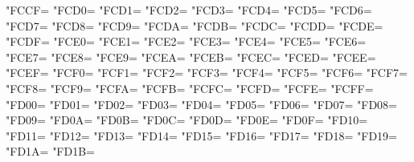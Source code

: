 \XeTeXcharclass"FCCF=\KclassArabU
\XeTeXcharclass"FCD0=\KclassArabU
\XeTeXcharclass"FCD1=\KclassArabU
\XeTeXcharclass"FCD2=\KclassArabU
\XeTeXcharclass"FCD3=\KclassArabU
\XeTeXcharclass"FCD4=\KclassArabU
\XeTeXcharclass"FCD5=\KclassArabU
\XeTeXcharclass"FCD6=\KclassArabU
\XeTeXcharclass"FCD7=\KclassArabU
\XeTeXcharclass"FCD8=\KclassArabU
\XeTeXcharclass"FCD9=\KclassArabU
\XeTeXcharclass"FCDA=\KclassArabU
\XeTeXcharclass"FCDB=\KclassArabU
\XeTeXcharclass"FCDC=\KclassArabU
\XeTeXcharclass"FCDD=\KclassArabU
\XeTeXcharclass"FCDE=\KclassArabU
\XeTeXcharclass"FCDF=\KclassArabU
\XeTeXcharclass"FCE0=\KclassArabU
\XeTeXcharclass"FCE1=\KclassArabU
\XeTeXcharclass"FCE2=\KclassArabU
\XeTeXcharclass"FCE3=\KclassArabU
\XeTeXcharclass"FCE4=\KclassArabU
\XeTeXcharclass"FCE5=\KclassArabU
\XeTeXcharclass"FCE6=\KclassArabU
\XeTeXcharclass"FCE7=\KclassArabU
\XeTeXcharclass"FCE8=\KclassArabU
\XeTeXcharclass"FCE9=\KclassArabU
\XeTeXcharclass"FCEA=\KclassArabU
\XeTeXcharclass"FCEB=\KclassArabU
\XeTeXcharclass"FCEC=\KclassArabU
\XeTeXcharclass"FCED=\KclassArabU
\XeTeXcharclass"FCEE=\KclassArabU
\XeTeXcharclass"FCEF=\KclassArabU
\XeTeXcharclass"FCF0=\KclassArabU
\XeTeXcharclass"FCF1=\KclassArabU
\XeTeXcharclass"FCF2=\KclassArabU
\XeTeXcharclass"FCF3=\KclassArabU
\XeTeXcharclass"FCF4=\KclassArabU
\XeTeXcharclass"FCF5=\KclassArabU
\XeTeXcharclass"FCF6=\KclassArabU
\XeTeXcharclass"FCF7=\KclassArabU
\XeTeXcharclass"FCF8=\KclassArabU
\XeTeXcharclass"FCF9=\KclassArabU
\XeTeXcharclass"FCFA=\KclassArabU
\XeTeXcharclass"FCFB=\KclassArabU
\XeTeXcharclass"FCFC=\KclassArabU
\XeTeXcharclass"FCFD=\KclassArabU
\XeTeXcharclass"FCFE=\KclassArabU
\XeTeXcharclass"FCFF=\KclassArabU
\XeTeXcharclass"FD00=\KclassArabU
\XeTeXcharclass"FD01=\KclassArabU
\XeTeXcharclass"FD02=\KclassArabU
\XeTeXcharclass"FD03=\KclassArabU
\XeTeXcharclass"FD04=\KclassArabU
\XeTeXcharclass"FD05=\KclassArabU
\XeTeXcharclass"FD06=\KclassArabU
\XeTeXcharclass"FD07=\KclassArabU
\XeTeXcharclass"FD08=\KclassArabU
\XeTeXcharclass"FD09=\KclassArabU
\XeTeXcharclass"FD0A=\KclassArabU
\XeTeXcharclass"FD0B=\KclassArabU
\XeTeXcharclass"FD0C=\KclassArabU
\XeTeXcharclass"FD0D=\KclassArabU
\XeTeXcharclass"FD0E=\KclassArabU
\XeTeXcharclass"FD0F=\KclassArabU
\XeTeXcharclass"FD10=\KclassArabU
\XeTeXcharclass"FD11=\KclassArabU
\XeTeXcharclass"FD12=\KclassArabU
\XeTeXcharclass"FD13=\KclassArabU
\XeTeXcharclass"FD14=\KclassArabU
\XeTeXcharclass"FD15=\KclassArabU
\XeTeXcharclass"FD16=\KclassArabU
\XeTeXcharclass"FD17=\KclassArabU
\XeTeXcharclass"FD18=\KclassArabU
\XeTeXcharclass"FD19=\KclassArabU
\XeTeXcharclass"FD1A=\KclassArabU
\XeTeXcharclass"FD1B=\KclassArabU
